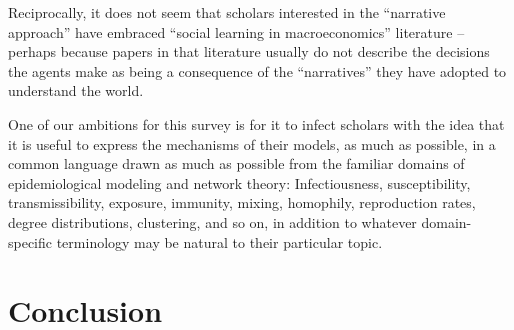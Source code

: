 Reciprocally, it does not seem that scholars interested in the ``narrative approach'' have embraced ``social learning in macroeconomics'' literature -- perhaps because papers in that literature usually do not describe the decisions the agents make as being a consequence of the ``narratives'' they have adopted to understand the world.

One of our ambitions for this survey is for it to infect scholars with the idea that it is useful to express the mechanisms of their models, as much as possible, in a common language drawn as much as possible from the familiar domains of epidemiological modeling and network theory:  Infectiousness, susceptibility, transmissibility, exposure, immunity, mixing, homophily, reproduction rates, degree distributions, clustering, and so on, in addition to whatever domain-specific terminology may be natural to their particular topic.

\section{Conclusion}




% 



% 

\pagebreak

